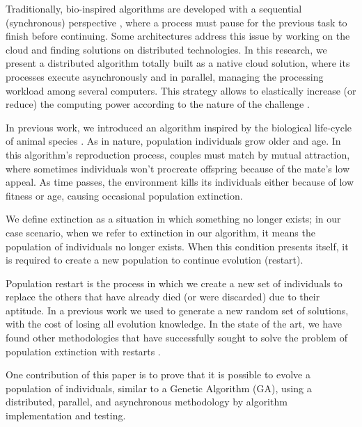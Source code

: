 \documentclass[graybox]{svmult}
\begin{document}
    Traditionally, bio-inspired algorithms are developed with a sequential
    (synchronous) perspective
    \cite{porto2018evolutionary,back1996evolutionary}, where a process must
    pause for the previous task to finish before continuing. 
    Some architectures address this issue \cite{valdez2021container,garcia2015evospace,merelo2016nodio} 
    by working on the cloud and finding solutions on distributed technologies.
    In this research, we present a distributed algorithm totally built as a 
    native cloud solution, where its processes execute asynchronously and in 
    parallel, managing the processing workload among several computers.  
    This strategy allows to elastically increase (or reduce) the
    computing power according to the nature of the challenge
    \cite{armbrust2010view}.

    In previous work, we introduced an algorithm inspired by the biological
    life-cycle of animal species \cite{Felix-Saul2022}. As in nature, population individuals grow older
    and age. In this algorithm's reproduction process, couples must match by mutual
    attraction, where sometimes individuals won't procreate offspring because of
    the mate's low appeal. As time passes, the environment kills its individuals
    either because of low fitness or age, causing occasional population extinction.
    
    We define extinction as a situation in which something no longer exists; in
    our case scenario, when we refer to extinction in our algorithm, it means
    the population of individuals no longer exists. When this condition
    presents itself, it is required to create a new population to continue
    evolution (restart). 
    
    Population restart is the process in which we create a
    new set of individuals to replace the others that have already died (or
    were discarded) due to their aptitude. In a previous work \cite{Felix-Saul2022} 
    we used to generate a new random set of solutions, with the cost of losing 
    all evolution knowledge. In the state of the art, we have found other methodologies 
    that have successfully sought to solve the problem of population extinction with
    restarts \cite{hellwig2020modified, loshchilov2013cma, jansen2010aging, tendresse2001effects, mathias1998effects}.
        
    One contribution of this paper is to prove that it is possible to
    evolve a population of individuals, similar to a Genetic Algorithm (GA),
    using a distributed, parallel, and asynchronous methodology by algorithm
    implementation and testing.
\end{document}
